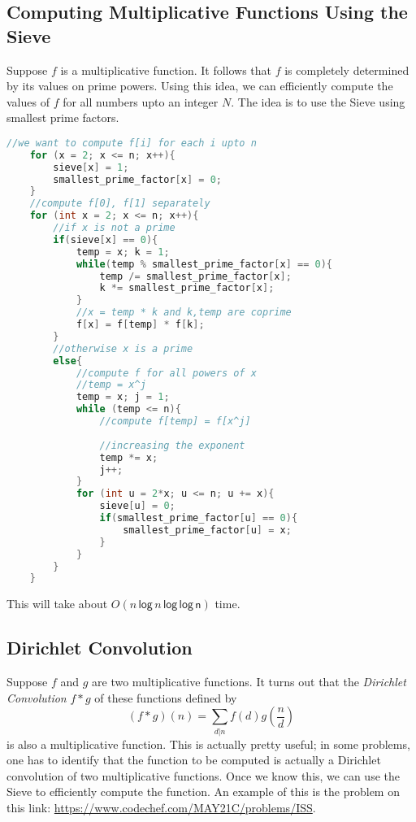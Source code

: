 \documentclass[12pt,a4paper]{amsart}
\numberwithin{equation}{section}
\theoremstyle{definition}
\begin{document}
\subsection{Computing Multiplicative Functions Using the Sieve} Suppose $f$ is a multiplicative function. It follows that $f$ is completely determined by its values on prime powers. Using this idea, we can efficiently compute the values of $f$ for all numbers upto an integer $N$. The idea is to use the Sieve using smallest prime factors. 

\begin{lstlisting}[language=C++]
    //we want to compute f[i] for each i upto n
    for (x = 2; x <= n; x++){
        sieve[x] = 1;
        smallest_prime_factor[x] = 0;
    }
    //compute f[0], f[1] separately
    for (int x = 2; x <= n; x++){
        //if x is not a prime
        if(sieve[x] == 0){
            temp = x; k = 1;
            while(temp % smallest_prime_factor[x] == 0){
                temp /= smallest_prime_factor[x];
                k *= smallest_prime_factor[x];
            }
            //x = temp * k and k,temp are coprime
            f[x] = f[temp] * f[k];
        }
        //otherwise x is a prime
        else{
            //compute f for all powers of x
            //temp = x^j
            temp = x; j = 1;
            while (temp <= n){
                //compute f[temp] = f[x^j]
                
                //increasing the exponent
                temp *= x;
                j++;
            }
            for (int u = 2*x; u <= n; u += x){
                sieve[u] = 0;
                if(smallest_prime_factor[u] == 0){
                    smallest_prime_factor[u] = x;
                }
            }
        }
    }    
\end{lstlisting}

This will take about $O(n\,\mathsf{log\,}n\,\mathsf{log\,log\,n})$ time. 

\subsection{Dirichlet Convolution} Suppose $f$ and $g$ are two multiplicative functions. It turns out that the \textit{Dirichlet Convolution} $f*g$ of these functions defined by 
$$(f*g)(n) = \sum_{d|n}f(d)g\left(\dfrac{n}{d}\right)$$
is also a multiplicative function. This is actually pretty useful; in some problems, one has to identify that the function to be computed is actually a Dirichlet convolution of two multiplicative functions. Once we know this, we can use the Sieve to efficiently compute the function. An example of this is the problem on this link: \url{https://www.codechef.com/MAY21C/problems/ISS}.
\end{document}
